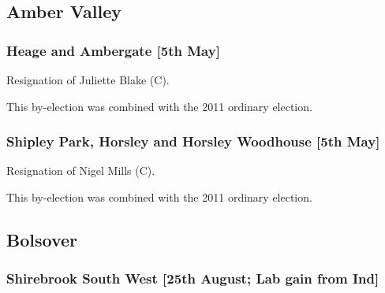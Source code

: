 \begin{resultsiii}
\subsection*{Amber Valley}

\subsubsection*{Heage and Ambergate \hspace*{\fill}\nolinebreak[1]%
\enspace\hspace*{\fill}
[5th May]}


Resignation of Juliette Blake (C).

This by-election was combined with the 2011 ordinary election.

\subsubsection*{Shipley Park, Horsley and Horsley Woodhouse \hspace*{\fill}\nolinebreak[1]%
\enspace\hspace*{\fill}
[5th May]}


Resignation of Nigel Mills (C).

This by-election was combined with the 2011 ordinary election.

\subsection*{Bolsover}

\subsubsection*{Shirebrook South West \hspace*{\fill}\nolinebreak[1]%
\enspace\hspace*{\fill}
[25th August; Lab gain from Ind]}



\end{resultsiii}
